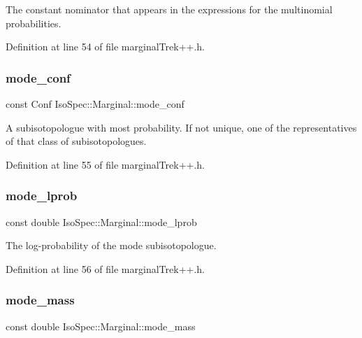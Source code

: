 The constant nominator that appears in the expressions for the multinomial probabilities. 

Definition at line 54 of file marginal\+Trek++.\+h.

\mbox{\label{class_iso_spec_1_1_marginal_a640f3b44605b510ee556a25e35a2e095}} 
\subsubsection{\texorpdfstring{mode\+\_\+conf}{mode\_conf}}
{\footnotesize\ttfamily const Conf Iso\+Spec\+::\+Marginal\+::mode\+\_\+conf\hspace{0.3cm}{\ttfamily [protected]}}

A subisotopologue with most probability. If not unique, one of the representatives of that class of subisotopologues. 

Definition at line 55 of file marginal\+Trek++.\+h.

\mbox{\label{class_iso_spec_1_1_marginal_a38238e7581f59f08d0faf8ab5eabc0dc}} 
\subsubsection{\texorpdfstring{mode\+\_\+lprob}{mode\_lprob}}
{\footnotesize\ttfamily const double Iso\+Spec\+::\+Marginal\+::mode\+\_\+lprob\hspace{0.3cm}{\ttfamily [protected]}}

The log-\/probability of the mode subisotopologue. 

Definition at line 56 of file marginal\+Trek++.\+h.

\mbox{\label{class_iso_spec_1_1_marginal_a3bfea931e5e1ec1e7d90e8e096c38eb7}} 
\subsubsection{\texorpdfstring{mode\+\_\+mass}{mode\_mass}}
{\footnotesize\ttfamily const double Iso\+Spec\+::\+Marginal\+::mode\+\_\+mass\hspace{0.3cm}{\ttfamily [protected]}}

